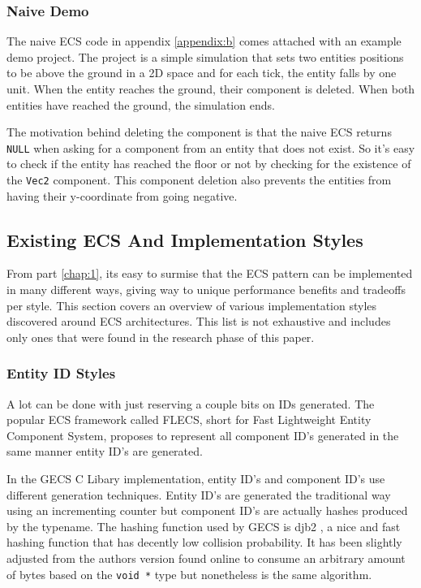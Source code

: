 \subsubsection{Naive Demo}
The naive ECS code in appendix \ref{appendix:b} comes attached with an example demo project. The project is a simple simulation that sets two entities positions to be above the ground in a 2D space and for each tick, the entity falls by one unit. When the entity reaches the ground, their component is deleted. When both entities have reached the ground, the simulation ends. 

The motivation behind deleting the component is that the naive ECS returns \texttt{NULL} when asking for a component from an entity that does not exist. So it's easy to check if the entity has reached the floor or not by checking for the existence of the \texttt{Vec2} component. This component deletion also prevents the entities from having their y-coordinate from going negative.

\subsection{Existing ECS And Implementation Styles}
From part \ref{chap:1}, its easy to surmise that the ECS pattern can be implemented in many different ways, giving way to unique performance benefits and tradeoffs per style. This section covers an overview of various implementation styles discovered around ECS architectures. This list is not exhaustive and includes only ones that were found in the research phase of this paper. 

\subsubsection{Entity ID Styles}
A lot can be done with just reserving a couple bits on IDs generated. The popular ECS framework called FLECS, short for Fast Lightweight Entity Component System, proposes to represent all component ID's generated in the same manner entity ID's are generated. 

In the GECS C Libary implementation, entity ID's and component ID's use different generation techniques. Entity ID's are generated the traditional way using an incrementing counter but component ID's are actually hashes produced by the typename. The hashing function used by GECS is djb2 \cite{hashing}, a nice and fast hashing function that has decently low collision probability. It has been slightly adjusted from the authors version found online to consume an arbitrary amount of bytes based on the \texttt{void *} type but nonetheless is the same algorithm. 

